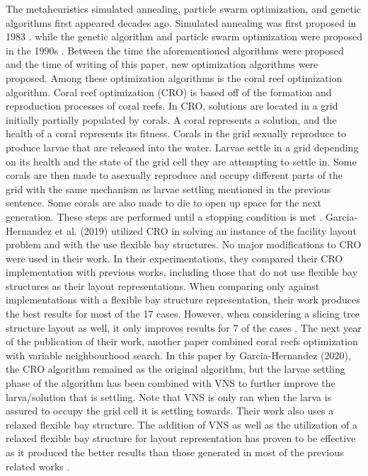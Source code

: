 The metaheuristics simulated annealing, particle swarm optimization, and genetic algorithms first appeared decades ago. Simulated annealing was first proposed in 1983 \cite{Kirkpatrick1983}. while the genetic algorithm and particle swarm optimization were proposed in the 1990s \cite{Katoch2021}\cite{Kennedy1995}. Between the time the aforementioned algorithms were proposed and the time of writing of this paper, new optimization algorithms were proposed. Among these optimization algorithms is the coral reef optimization algorithm. Coral reef optimization (CRO) is based off of the formation and reproduction processes of coral reefs. In CRO, solutions are located in a grid initially partially populated by corals. A coral represents a solution, and the health of a coral represents its fitness. Corals in the grid sexually reproduce to produce larvae that are released into the water. Larvae settle in a grid depending on its health and the state of the grid cell they are attempting to settle in. Some corals are then made to asexually reproduce and occupy different parts of the grid with the same mechanism as larvae settling mentioned in the previous sentence. Some corals are also made to die to open up space for the next generation. These steps are performed until a stopping condition is met \cite{Salcedo-Sanz2014}. Garcia-Hernandez et al. (2019) utilized CRO in solving an instance of the facility layout problem and with the use flexible bay structures. No major modifications to CRO were used in their work. In their experimentations, they compared their CRO implementation with previous works, including those that do not use flexible bay structures as their layout representations. When comparing only against implementations with a flexible bay structure representation, their work produces the best results for most of the 17 cases. However, when considering a slicing tree structure layout as well, it only improves results for 7 of the cases \cite{Garcia-Hernandez2019}. The next year of the publication of their work, another paper combined coral reefs optimization with variable neighbourhood search. In this paper by Garcia-Hernandez (2020), the CRO algorithm remained as the original algorithm, but the larvae settling phase of the algorithm has been combined with VNS to further improve the larva/solution that is settling. Note that VNS is only ran when the larva is assured to occupy the grid cell it is settling towards. Their work also uses a relaxed flexible bay structure. The addition of VNS as well as the utilization of a relaxed flexible bay structure for layout representation has proven to be effective as it produced the better results than those generated in most of the previous related works \cite{Garcia-Hernandez2020}.

